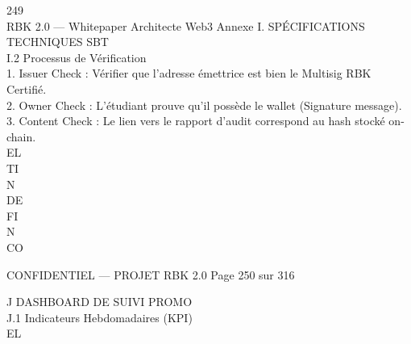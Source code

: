 \documentclass[12pt,landscape,a4paper]{article}
\newenvironment{confidential}
{\begin{tcolorbox}[
    colback=rbkred!5!white,
    colframe=rbkred!75!black,
    title=CONFIDENTIEL,
    fonttitle=\bfseries\color{white},
    coltitle=rbkred!75!black,
    breakable,
    enhanced,
    frame hidden,
    borderline west={2pt}{0pt}{rbkred!75!black}
]}
{\end{tcolorbox}}
\begin{document}
\vspace{0.5em}
\vspace{0.5em}
\vspace{0.5em}
249\\
RBK 2.0 — Whitepaper Architecte Web3                                                       Annexe I. SPÉCIFICATIONS TECHNIQUES SBT\\
\vspace{0.5em}
\vspace{0.5em}
\vspace{0.5em}
I.2 Processus de Vérification\\
1. Issuer Check : Vérifier que l’adresse émettrice est bien le Multisig RBK Certifié.\\
\vspace{0.5em}
2. Owner Check : L’étudiant prouve qu’il possède le wallet (Signature message).\\
\vspace{0.5em}
3. Content Check : Le lien vers le rapport d’audit correspond au hash stocké on-chain.\\
\vspace{0.5em}
\vspace{0.5em}
\vspace{0.5em}
\vspace{0.5em}
EL\\
TI\\
N\\
DE\\
FI\\
N\\
CO\\
\vspace{0.5em}
\vspace{0.5em}
\vspace{0.5em}
\vspace{0.5em}
\begin{confidential}CONFIDENTIEL — PROJET RBK 2.0                                           Page 250 sur 316\end{confidential}
J \textbar{} DASHBOARD DE SUIVI PROMO\\
\vspace{0.5em}
\vspace{0.5em}
J.1 Indicateurs Hebdomadaires (KPI)\\
\vspace{0.5em}
\vspace{0.5em}
\vspace{0.5em}
\vspace{0.5em}
EL\\
\end{document}
